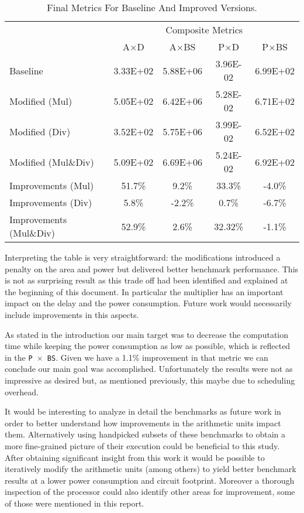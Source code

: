 \begin{table}[H]
{\begin{tabular}{lcccc}
& \multicolumn{4}{c}{Composite Metrics}\\
&
\ttfamily A$\times$D &
\ttfamily A$\times$BS &
\ttfamily P$\times$D &
\ttfamily P$\times$BS\\
Baseline &
\num{3.33E+02} &
\num{5.88E+06} &
\num{3.96E-02} &
\num{6.99E+02} \\
Modified (Mul)&
\num{5.05E+02} &
\num{6.42E+06} &
\num{5.28E-02} &
\num{6.71E+02} \\
Modified (Div)&
\num{3.52E+02} &
\num{5.75E+06} &
\num{3.99E-02} &
\num{6.52E+02} \\
Modified (Mul\&Div)&
\num{5.09E+02} &
\num{6.69E+06} &
\num{5.24E-02} &
\num{6.92E+02} \\
Improvements (Mul) &
\color{red} 			51.7\% &
\color{red} 			9.2\% &
\color{red} 			33.3\% &
\color{green!60!black} 	-4.0\% \\
Improvements (Div) &
\color{red} 5.8\% &
\color{green!60!black} -2.2\% &
\color{red} 0.7\% &
\color{green!60!black} -6.7\% \\
Improvements (Mul\&Div)&
\color{red} 52.9\% &
\color{red} 2.6\% &
\color{red} 32.32\% &
\color{green!60!black} -1.1\%\\
\end{tabular}}
\caption{Final Metrics For Baseline And Improved Versions.}
\label{tbl:final_metrics}
\end{table}

Interpreting the table is very straightforward: the modifications introduced a penalty on the area and power but delivered better benchmark performance. This is not as surprising result as this trade off had been identified and explained at the beginning of this document. In particular the multiplier has an important impact on the delay and the power consumption. Future work would necessarily include improvements in this aspects.

As stated in the introduction our main target was to decrease the computation time while keeping the power consumption as low as possible, which is reflected in the \texttt{P $\times$ BS}. Given we have a 1.1\% improvement in that metric we can conclude our main goal was accomplished. Unfortunately the results were not as impressive as desired but, as mentioned previously, this maybe due to scheduling overhead.

It would be interesting to analyze in detail the benchmarks as future work in order to better understand how improvements in the arithmetic units impact them. Alternatively using handpicked subsets of these benchmarks to obtain a more fine-grained picture of their execution could be beneficial to this study. After obtaining significant insight from this work it would be possible to iteratively modify the arithmetic units (among others) to yield better benchmark results at a lower power consumption and circuit footprint.
Moreover a thorough inspection of the processor could also identify other areas for improvement, some of those were mentioned in this report. 
